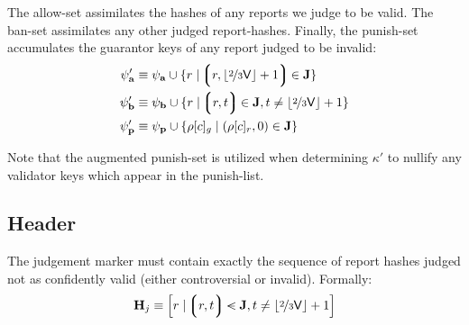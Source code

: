 The allow-set assimilates the hashes of any reports we judge to be valid. The ban-set assimilates any other judged report-hashes. Finally, the punish-set accumulates the guarantor keys of any report judged to be invalid:
\begin{align}
  \psi'_\mathbf{a} &\equiv \psi_\mathbf{a} \cup \{r \mid \tup{r, \floor{\nicefrac{2}{3}\mathsf{V}} + 1} \in \mathbf{J} \} \\
  \psi'_\mathbf{b} &\equiv \psi_\mathbf{b} \cup \{r \mid \tup{r, t} \in \mathbf{J}, t \ne \floor{\nicefrac{2}{3}\mathsf{V}} + 1 \} \\
  \psi'_\mathbf{p} &\equiv \psi_\mathbf{p} \cup \{ \rho[c]_g \mid (\rho[c]_r, 0) \in \mathbf{J} \}
\end{align}

Note that the augmented punish-set is utilized when determining $\kappa'$ to nullify any validator keys which appear in the punish-list.

\subsection{Header}\label{sec:judgementmarker}

The judgement marker must contain exactly the sequence of report hashes judged not as confidently valid (\ie either controversial or invalid). Formally:
\begin{equation}
  \mathbf{H}_j \equiv \sq{r \mid \tup{r, t} \orderedin \mathbf{J}, t \ne \floor{\nicefrac{2}{3}\mathsf{V}} + 1}
\end{equation}
